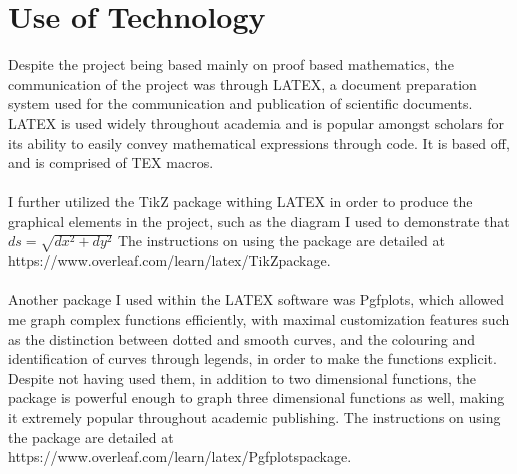 \documentclass[12pt]{report}
\begin{document}
\chapter{Use of Technology}
Despite the project being based mainly on proof based mathematics, the communication of the project was through LATEX, a document preparation system used for the communication and publication of scientific documents. LATEX is used widely throughout academia and is popular amongst scholars for its ability to easily convey mathematical expressions through code. It is based off, and is comprised of TEX macros.
\\
\\
I further utilized the TikZ package withing LATEX in order to produce the graphical elements in the project, such as the diagram I used to demonstrate that \(ds = \sqrt{dx^2+dy^2}\)
The instructions on using the package are detailed at https://www.overleaf.com/learn/latex/TikZpackage.
\\
\\
Another package I used within the LATEX software was Pgfplots, which allowed me graph complex functions efficiently, with maximal customization features such as the distinction between dotted and smooth curves, and the colouring and identification of curves through legends, in order to make the functions explicit. Despite not having used them, in addition to two dimensional functions, the package is powerful enough to graph three dimensional functions as well, making it extremely popular throughout academic publishing. The instructions on using the package are detailed at https://www.overleaf.com/learn/latex/Pgfplotspackage.


 
\end{document}

